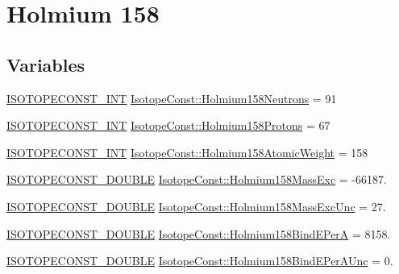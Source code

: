 \hypertarget{group___isotope_const-_holmium-_ho158}{}\section{Holmium 158}
\label{group___isotope_const-_holmium-_ho158}
\subsection*{Variables}
\begin{DoxyCompactItemize}
\item 
\mbox{\hyperlink{group___isotope_const-_macros_ga5f18360b3e99483a35c32d789e62621c}{I\+S\+O\+T\+O\+P\+E\+C\+O\+N\+S\+T\+\_\+\+I\+NT}} \mbox{\hyperlink{group___isotope_const-_holmium-_ho158_ga6da89349211a3ee9ae8b24a069776287}{Isotope\+Const\+::\+Holmium158\+Neutrons}} = 91
\item 
\mbox{\hyperlink{group___isotope_const-_macros_ga5f18360b3e99483a35c32d789e62621c}{I\+S\+O\+T\+O\+P\+E\+C\+O\+N\+S\+T\+\_\+\+I\+NT}} \mbox{\hyperlink{group___isotope_const-_holmium-_ho158_ga0c35ecd24f6411e33f7efb9b5756a533}{Isotope\+Const\+::\+Holmium158\+Protons}} = 67
\item 
\mbox{\hyperlink{group___isotope_const-_macros_ga5f18360b3e99483a35c32d789e62621c}{I\+S\+O\+T\+O\+P\+E\+C\+O\+N\+S\+T\+\_\+\+I\+NT}} \mbox{\hyperlink{group___isotope_const-_holmium-_ho158_gaa99970ed2795b5d3bf22106cac8e5294}{Isotope\+Const\+::\+Holmium158\+Atomic\+Weight}} = 158
\item 
\mbox{\hyperlink{group___isotope_const-_macros_ga8f45a7272ce02c0b4c65c44636ed719a}{I\+S\+O\+T\+O\+P\+E\+C\+O\+N\+S\+T\+\_\+\+D\+O\+U\+B\+LE}} \mbox{\hyperlink{group___isotope_const-_holmium-_ho158_ga388d10581fb9ea73bb8b67ed8aaddfd9}{Isotope\+Const\+::\+Holmium158\+Mass\+Exc}} = -\/66187.
\item 
\mbox{\hyperlink{group___isotope_const-_macros_ga8f45a7272ce02c0b4c65c44636ed719a}{I\+S\+O\+T\+O\+P\+E\+C\+O\+N\+S\+T\+\_\+\+D\+O\+U\+B\+LE}} \mbox{\hyperlink{group___isotope_const-_holmium-_ho158_gac956f1c927b65123e94e6cadec7ad438}{Isotope\+Const\+::\+Holmium158\+Mass\+Exc\+Unc}} = 27.
\item 
\mbox{\hyperlink{group___isotope_const-_macros_ga8f45a7272ce02c0b4c65c44636ed719a}{I\+S\+O\+T\+O\+P\+E\+C\+O\+N\+S\+T\+\_\+\+D\+O\+U\+B\+LE}} \mbox{\hyperlink{group___isotope_const-_holmium-_ho158_gaa4d02ee9ea6e123ab1ef9b2781f90e66}{Isotope\+Const\+::\+Holmium158\+Bind\+E\+PerA}} = 8158.
\item 
\mbox{\hyperlink{group___isotope_const-_macros_ga8f45a7272ce02c0b4c65c44636ed719a}{I\+S\+O\+T\+O\+P\+E\+C\+O\+N\+S\+T\+\_\+\+D\+O\+U\+B\+LE}} \mbox{\hyperlink{group___isotope_const-_holmium-_ho158_gaf9279bc261823de3f7cf3b645b30b2c6}{Isotope\+Const\+::\+Holmium158\+Bind\+E\+Per\+A\+Unc}} = 0.

\end{DoxyCompactItemize}
